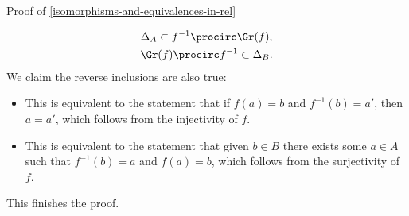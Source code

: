 \begin{Proof}{Proof of \cref{isomorphisms-and-equivalences-in-rel}}
\begin{itemize}
            \begin{gather*}
                \Delta_{A}            \subset f^{-1}\procirc\Gr(f),\\
                \Gr(f)\procirc f^{-1} \subset \Delta_{B}.
            \end{gather*}
            We claim the reverse inclusions are also true:
            \begin{itemize}
                \item{}This is equivalent to the statement that if $f(a)=b$ and $f^{-1}(b)=a'$, then $a=a'$, which follows from the injectivity of $f$.
                \item{}This is equivalent to the statement that given $b\in B$ there exists some $a\in A$ such that $f^{-1}(b)=a$ and $f(a)=b$, which follows from the surjectivity of $f$.
            \end{itemize}
    \end{itemize}
    This finishes the proof.
\end{Proof}
